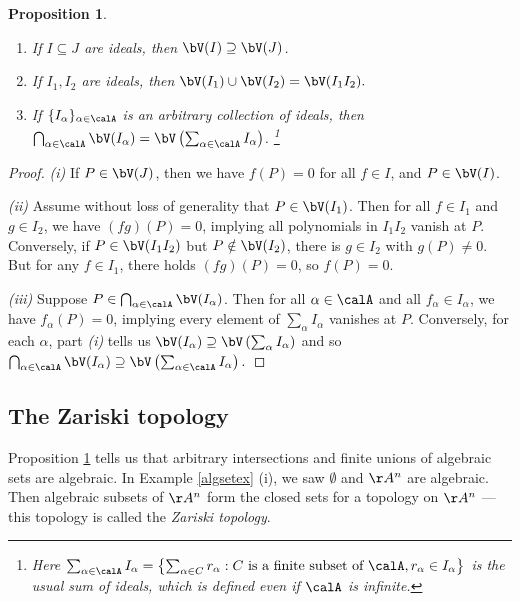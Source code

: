 \documentclass[12pt]{amsart}
\theoremstyle{plain}
\newtheorem{proposition}[theorem]{Proposition}
\begin{document}
\begin{proposition}\label{vproperties}
\begin{enumerate}[\itshape(i)]
\item If $I \subseteq J$ are ideals, then $\bV(I) \supseteq \bV(J)$.
\item If $I_1, I_2$ are ideals, then $\bV(I_1) \cup \bV(I_2) = \bV(I_1 I_2).$
\item If $\{I_\alpha\}_{\alpha \in \calA}$ is an arbitrary collection of ideals, then $\bigcap_{\alpha \in \calA} \bV(I_\alpha) = \bV\left(\sum_{\alpha \in \calA} I_\alpha\right)$.
\footnote{Here $\sum_{\alpha\in\calA} I_\alpha = \left\{\sum_{\alpha \in C} r_\alpha : C \text{ is a finite subset of } \calA, r_\alpha \in I_\alpha \right\}$ is the usual sum of ideals, which is defined even if $\calA$ is infinite.}
\end{enumerate}
\end{proposition}
\begin{proof}
\emph{(i)} If $P \in \bV(J)$, then we have $f(P)=0$ for all $f \in I$, and $P \in \bV(I)$.

\emph{(ii)} Assume without loss of generality that $P \in \bV(I_1)$.
Then for all $f \in I_1$ and $g \in I_2$, we have $(fg)(P)=0$, implying all polynomials in $I_1 I_2$ vanish at $P$.
Conversely, if $P \in \bV(I_1 I_2)$ but $P \notin \bV(I_2)$, there is $g \in I_2$ with $g(P) \ne 0$.
But for any $f \in I_1$, there holds $(fg)(P)=0$, so $f(P)=0$.

\emph{(iii)} Suppose $P \in \bigcap_{\alpha \in \calA} \bV(I_\alpha)$.
Then for all $\alpha \in \calA$ and all $f_\alpha \in I_\alpha$, we have $f_\alpha(P) = 0$, implying every element of $\sum_{\alpha} I_\alpha$ vanishes at $P$.
Conversely, for each $\alpha$, part \emph{(i)} tells us $\bV(I_\alpha) \supseteq \bV\left(\sum_{\alpha} I_\alpha\right)$ and so 
$\bigcap_{\alpha\in\calA} \bV(I_\alpha) \supseteq \bV\left(\sum_{\alpha\in\calA} I_\alpha\right).$
\end{proof}

\subsection{The Zariski topology}
Proposition \ref{vproperties} tells us that arbitrary intersections and finite unions of algebraic sets are algebraic.
In Example \ref{algsetex} (i), we saw $\emptyset$ and $\AA^n$ are algebraic.
Then algebraic subsets of $\AA^n$ form the closed sets for a topology on $\AA^n$ --- this topology is called the \emph{Zariski topology}.
\end{document}
